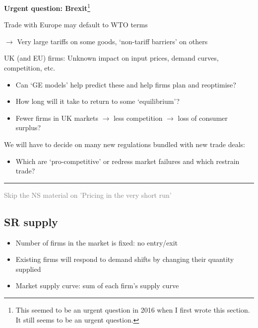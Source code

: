 \documentclass[]{article}
\providecommand{\tightlist}{%
  \setlength{\itemsep}{0pt}\setlength{\parskip}{0pt}}
\begin{document}
\textbf{Urgent question: Brexit}\footnote{This seemed to be an urgent
  question in 2016 when I first wrote this section. It still seems to be
  an urgent question.}

\bigskip

Trade with Europe may default to WTO terms

\bigskip

\(\rightarrow\) Very large tariffs on some goods, `non-tariff barriers'
on others

\bigskip

UK (and EU) firms: Unknown impact on input prices, demand curves,
competition, etc.

\begin{itemize}
\item
  Can `GE models' help predict these and help firms plan and reoptimise?
\item
  How long will it take to return to some `equilibrium'?
\end{itemize}

\bigskip

\begin{itemize}
\tightlist
\item
  Fewer firms in UK markets \(\rightarrow\) less competition
  \(\rightarrow\) loss of consumer surplus?
\end{itemize}

We will have to decide on many new regulations bundled with new trade
deals:

\begin{itemize}
\tightlist
\item
  Which are `pro-competitive' or redress market failures and which
  restrain trade?
\end{itemize}

\begin{center}\rule{0.5\linewidth}{\linethickness}\end{center}

\textcolor{gray}{Skip the NS material on 'Pricing in the very short run'}

\hypertarget{sr-supply}{%
\subsection{SR supply}\label{sr-supply}}

\begin{itemize}
\item
  Number of firms in the market is fixed: no entry/exit
\item
  Existing firms will respond to demand shifts by changing their
  quantity supplied
\item
  Market supply curve: sum of each firm's supply curve
\end{itemize}
\end{document}
